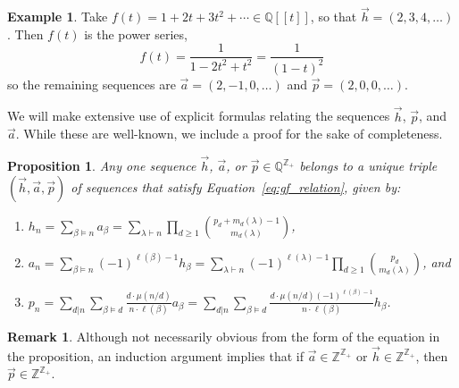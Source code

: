 \documentclass[11pt]{amsart}
\newtheorem{proposition}[theorem]{Proposition}
\theoremstyle{definition}
\newtheorem{example}[theorem]{Example}
\newtheorem{remark}[theorem]{Remark}
\numberwithin{equation}{section}
\def\ZZ{{\mathbb Z}}
\def\QQ{{\mathbb Q}}
\begin{document}
\begin{example}
Take $f(t) = 1 + 2t + 3 t^{2} + \cdots \in \QQ[[t]]$, so that $\vec{h} = (2, 3, 4, \ldots)$.
Then $f(t)$ is the power series,
\[
f(t) = \frac{1}{1 - 2 t^{2} + t^{2}} = \frac{1}{(1-t)^{2}}
\]
so the remaining sequences are $\vec{a} = (2, -1, 0, \ldots)$ and $\vec{p} = (2, 0, 0, \ldots)$.
\end{example}

We will make extensive use of explicit formulas relating the sequences $\vec{h}$, $\vec{p}$, and $\vec{a}$.  While these are well-known, we include a proof for the sake of completeness.

\begin{proposition}
\label{prop:sequences}
Any one sequence $\vec{h}$, $\vec{a}$, or $\vec{p} \in \QQ^{\ZZ_+}$ belongs to a unique triple $(\vec{h}, \vec{a}, \vec{p})$ of sequences that satisfy Equation~\eqref{eq:gf_relation}, given by:
\begin{enumerate}[label = (\roman*), itemsep = 1em]
\item $\displaystyle h_{n}
= \sum_{\beta \vDash n} a_\beta
= \sum_{\lambda \vdash n} \prod_{d \geq 1} \binom{p_d + m_d(\lambda) -1}{m_d(\lambda)}$, 

\item $\displaystyle a_n
= \sum_{\beta \vDash n} (-1)^{\ell(\beta)-1} h_\beta
= \sum_{\lambda \vdash n} (-1)^{\ell(\lambda)-1} \prod_{d \geq 1} \binom{p_d}{m_d(\lambda)}$, and

\item $\displaystyle p_n
= \sum_{d|n} \sum_{\beta \vDash d} \frac{d\cdot \mu(n/d)}{n \cdot \ell(\beta)} a_\beta
= \sum_{d|n} \sum_{\beta \vDash d} \frac{d\cdot \mu(n/d) (-1)^{\ell(\beta)-1}}{n \cdot \ell(\beta)} h_\beta$.

\end{enumerate}
\end{proposition}

\begin{remark} Although not necessarily obvious from the form of the equation in the proposition, 
an induction argument implies that if $\vec{a} \in \ZZ^{\ZZ_+}$ or $\vec{h} \in \ZZ^{\ZZ_+}$,
then $\vec{p} \in \ZZ^{\ZZ_+}$.
\end{remark}
\end{document}
